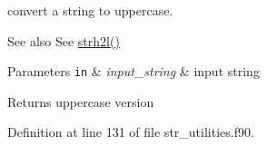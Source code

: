 convert a string to uppercase. 

\begin{DoxySeeAlso}{See also}
See \hyperlink{namespacestr__utilities_a219964a283968cc6a968db0197d2187e}{strh2l()}
\end{DoxySeeAlso}

\begin{DoxyParams}[1]{Parameters}
\mbox{\tt in}  & {\em input\+\_\+string} & input string\\
\hline
\end{DoxyParams}
\begin{DoxyReturn}{Returns}
uppercase version 
\end{DoxyReturn}


Definition at line 131 of file str\+\_\+utilities.\+f90.

